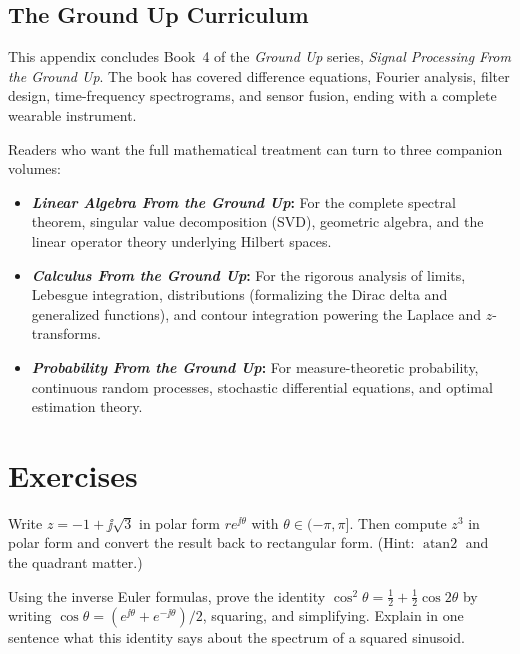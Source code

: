 \subsection{The Ground Up Curriculum}

This appendix concludes Book~4 of the \emph{Ground Up} series, \emph{Signal Processing From the Ground Up}. The book has covered difference equations, Fourier analysis, filter design, time-frequency spectrograms, and sensor fusion, ending with a complete wearable instrument.

Readers who want the full mathematical treatment can turn to three companion volumes:
\begin{itemize}
  \item \textbf{\emph{Linear Algebra From the Ground Up}:} For the complete spectral theorem, singular value decomposition (SVD), geometric algebra, and the linear operator theory underlying Hilbert spaces.
  \item \textbf{\emph{Calculus From the Ground Up}:} For the rigorous analysis of limits, Lebesgue integration, distributions (formalizing the Dirac delta and generalized functions), and contour integration powering the Laplace and $z$-transforms.
  \item \textbf{\emph{Probability From the Ground Up}:} For measure-theoretic probability, continuous random processes, stochastic differential equations, and optimal estimation theory.
\end{itemize}

\section{Exercises}
\label{ch42:exercises}

\begin{exercise}
Write $z = -1 + \jj\sqrt 3$ in polar form $r e^{\jj\theta}$ with $\theta\in(-\pi,\pi]$. Then
compute $z^3$ in polar form and convert the result back to rectangular form. (Hint:
$\operatorname{atan2}$ and the quadrant matter.)
\end{exercise}

\begin{exercise}
Using the inverse Euler formulas, prove the identity $\cos^2\theta = \tfrac12 + \tfrac12\cos
2\theta$ by writing $\cos\theta = (e^{\jj\theta} + e^{-\jj\theta})/2$, squaring, and simplifying.
Explain in one sentence what this identity says about the spectrum of a squared sinusoid.
\end{exercise}

